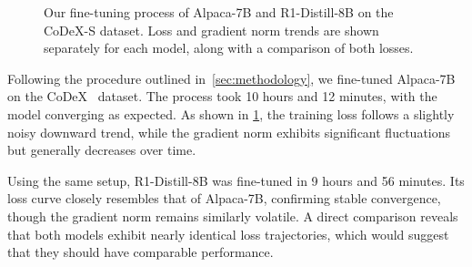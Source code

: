 \documentclass[12pt,a4paper]{article}
\newcommand{\modelalpaca}{Alpaca-7B\xspace}
\newcommand{\modeldeepseek}{R1-Distill-8B\xspace}
\begin{document}
\begin{figure}

    \vspace{0.2cm}
    {\centering
    }

    \caption{Our fine-tuning process of \modelalpaca and \modeldeepseek on the CoDeX-S dataset. Loss and gradient norm trends are shown separately for each model, along with a comparison of both losses.}
    \label{fig:kopa_finetuning_process}
\end{figure}


Following the procedure outlined in~\cref{sec:methodology}, we fine-tuned \modelalpaca on the CoDeX~\cite{safavi2020codex} dataset.
The process took 10 hours and 12 minutes, with the model converging as expected.
As shown in \cref{fig:kopa_finetuning_process}, the training loss follows a slightly noisy downward trend, while the gradient norm exhibits significant fluctuations but generally decreases over time.

Using the same setup, \modeldeepseek was fine-tuned in 9 hours and 56 minutes.
Its loss curve closely resembles that of \modelalpaca, confirming stable convergence, though the gradient norm remains similarly volatile.
A direct comparison reveals that both models exhibit nearly identical loss trajectories, which would suggest that they should have comparable performance.
\end{document}

